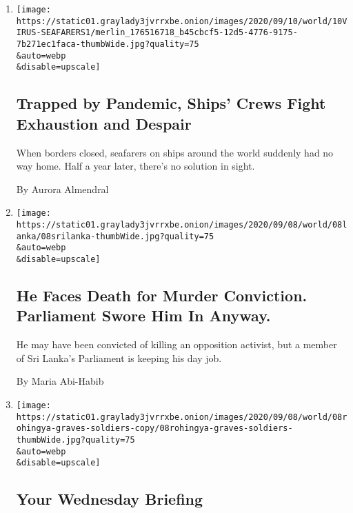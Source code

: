 \begin{enumerate}
\def\labelenumi{\arabic{enumi}.}
\item
  \href{/2020/09/09/business/coronavirus-sailors-cargo-ships.html}{}

  \texttt{[image: https://static01.graylady3jvrrxbe.onion/images/2020/09/10/world/10VIRUS-SEAFARERS1/merlin\_176516718\_b45cbcf5-12d5-4776-9175-7b271ec1faca-thumbWide.jpg?quality=75\\\&auto=webp\\\&disable=upscale]}

  \hypertarget{trapped-by-pandemic-ships-crews-fight-exhaustion-and-despair}{%
  \subsection{Trapped by Pandemic, Ships' Crews Fight Exhaustion and
  Despair}\label{trapped-by-pandemic-ships-crews-fight-exhaustion-and-despair}}

  When borders closed, seafarers on ships around the world suddenly had
  no way home. Half a year later, there's no solution in sight.

  By Aurora Almendral
\item
  \href{/2020/09/08/world/asia/sri-lanka-parliament-murder.html}{}

  \texttt{[image: https://static01.graylady3jvrrxbe.onion/images/2020/09/08/world/08lanka/08srilanka-thumbWide.jpg?quality=75\\\&auto=webp\\\&disable=upscale]}

  \hypertarget{he-faces-death-for-murder-conviction-parliament-swore-him-in-anyway}{%
  \subsection{He Faces Death for Murder Conviction. Parliament Swore Him
  In
  Anyway.}\label{he-faces-death-for-murder-conviction-parliament-swore-him-in-anyway}}

  He may have been convicted of killing an opposition activist, but a
  member of Sri Lanka's Parliament is keeping his day job.

  By Maria Abi-Habib
\item
  \href{/2020/09/08/briefing/rohingya-myanmar-china-border-india.html}{}

  \texttt{[image: https://static01.graylady3jvrrxbe.onion/images/2020/09/08/world/08rohingya-graves-soldiers-copy/08rohingya-graves-soldiers-thumbWide.jpg?quality=75\\\&auto=webp\\\&disable=upscale]}

  \hypertarget{your-wednesday-briefing}{%
  \subsection{Your Wednesday Briefing}\label{your-wednesday-briefing}}


\end{enumerate}
